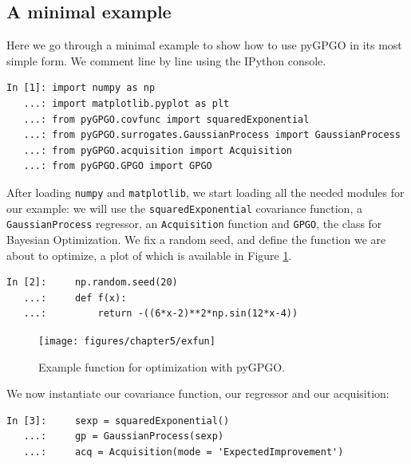 \documentclass[10pt,a4paper,twoside]{book}
\begin{document}
\subsection{A minimal example}

Here we go through a minimal example to show how to use pyGPGO in its most simple form. We comment line by line using the IPython console.

\begin{verbatim}
In [1]: import numpy as np
   ...: import matplotlib.pyplot as plt
   ...: from pyGPGO.covfunc import squaredExponential
   ...: from pyGPGO.surrogates.GaussianProcess import GaussianProcess
   ...: from pyGPGO.acquisition import Acquisition
   ...: from pyGPGO.GPGO import GPGO               
\end{verbatim}

After loading \texttt{numpy} and \texttt{matplotlib}, we start loading all the needed modules for our example: we will use the \texttt{squaredExponential} covariance function, a \texttt{GaussianProcess} regressor, an \texttt{Acquisition} function and \texttt{GPGO}, the class for Bayesian Optimization. We fix a random seed, and define the function we are about to optimize, a plot of which is available in Figure \ref{fig:exfun}.

\begin{verbatim}
In [2]:     np.random.seed(20)
   ...:     def f(x):
   ...:         return -((6*x-2)**2*np.sin(12*x-4))
\end{verbatim}

\begin{figure}
\centering
\caption{Example function for optimization with pyGPGO.}
\texttt{[image: figures/chapter5/exfun]}
\label{fig:exfun}
\end{figure}


We now instantiate our covariance function, our regressor and our acquisition:

\begin{verbatim}
In [3]:     sexp = squaredExponential()
   ...:     gp = GaussianProcess(sexp)
   ...:     acq = Acquisition(mode = 'ExpectedImprovement')
\end{verbatim}
\end{document}
